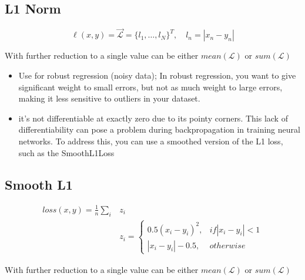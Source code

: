 \documentclass[11pt]{article}
\begin{document}
\subsection{L1 Norm}

\begin{definition}[L1 Norm]\label{eq:L1-norm}
    \begin{equation*}
        \ell(x,y)=\vec{\mathcal{L}} = \{ l_1, \ldots, l_N\}^T, \quad l_n=|x_n - y_n|
    \end{equation*}

    With further reduction to a single value can be either $mean(\mathcal L)$ or $sum(\mathcal{L})$ 
\end{definition}

\begin{itemize}
    \item Use for robust regression (noisy data); In robust regression, you want to give significant weight to small errors, but not as much weight to large errors, making it less sensitive to outliers in your dataset.
    \item it's not differentiable at exactly zero due to its pointy corners. This lack of differentiability can pose a problem during backpropagation in training neural networks. To address this, you can use a smoothed version of the L1 loss, such as the SmoothL1Loss
\end{itemize}

\subsection{Smooth L1}

\begin{definition}[Smooth L1]\label{eq:smooth-l1-norm}
    \begin{align*}
        loss(x,y)=\frac 1 n \sum_i & z_i \\
        & z_i = \begin{cases}
            0.5(x_i-y_i)^2, & if |x_i - y_i| < 1 \\ |x_i - y_i | - 0.5, & otherwise
        \end{cases}
    \end{align*}

    With further reduction to a single value can be either $mean(\mathcal L)$ or $sum(\mathcal{L})$ 
\end{definition}
\end{document}
